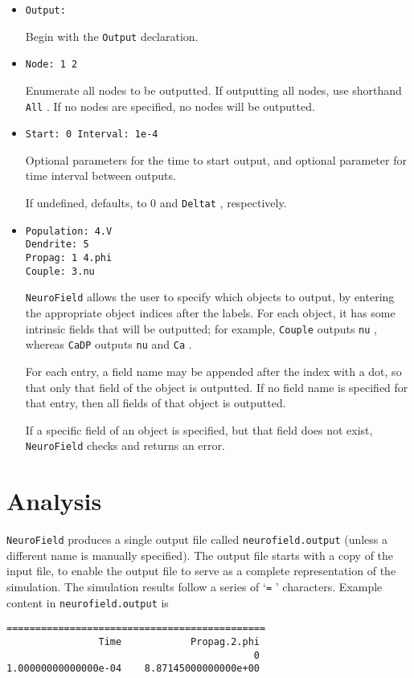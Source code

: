 \documentclass[12pt,a4paper]{article}
\newcommand{\type}[1]{{\small\small\tt #1} }
\newcommand{\NF}[0]{\type{NeuroField}}
\begin{document}
\begin{itemize}
	\item \begin{lstlisting}
Output:
		\end{lstlisting}
Begin with the \type{Output} declaration.
\item \begin{lstlisting}
Node: 1 2
\end{lstlisting}
Enumerate all nodes to be outputted. If outputting all nodes, use shorthand \type{All}. If no nodes are specified, no nodes will be outputted.
\item \begin{lstlisting}
Start: 0 Interval: 1e-4
\end{lstlisting}
Optional parameters for the time to start output, and optional parameter for time interval between outputs.

If undefined, defaults, to 0 and \type{Deltat}, respectively.
\item \begin{lstlisting}
Population: 4.V
Dendrite: 5
Propag: 1 4.phi
Couple: 3.nu
\end{lstlisting}

\NF allows the user to specify which objects to output, by entering the appropriate object indices after the labels. For each object, it has some intrinsic fields that will be outputted; for example, \type{Couple} outputs \type{nu}, whereas \type{CaDP} outputs \type{nu} and \type{Ca}.

For each entry, a field name may be appended after the index with a dot, so that only that field of the object is outputted. If no field name is specified for that entry, then all fields of that object is outputted.

If a specific field of an object is specified, but that field does not exist, \NF checks and returns an error.

\end{itemize}

\section{Analysis}
\label{sec:analysis}

\NF produces a single output file called \type{neurofield.output} (unless a different name is manually specified). The output file starts with a copy of the input file, to enable the output file to serve as a complete representation of the simulation. The simulation results follow a series of `\type{=}' characters. Example content in \type{neurofield.output} is
\begin{lstlisting}
=============================================
                Time            Propag.2.phi
                                           0
1.00000000000000e-04    8.87145000000000e+00
\end{lstlisting}
\end{document}
